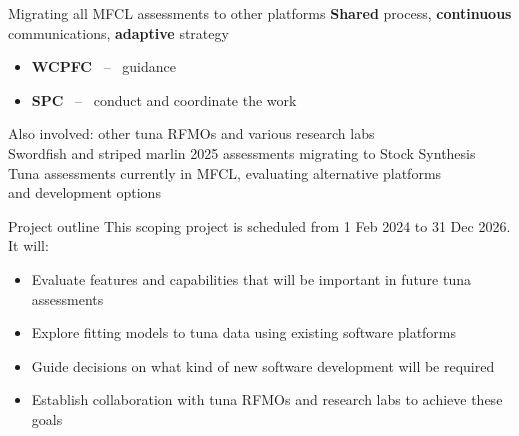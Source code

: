\documentclass[aspectratio=169,fleqn]{beamer}
\begin{document}

\begin{frame}{Migrating all MFCL assessments to other platforms}
  \textbf{\darkgreen Shared} process, {\darkgreen\bf continuous} communications,
  {\darkgreen\bf adaptive} strategy\\[2ex]
  \begin{itemize}
    \item[] {\blue\bf WCPFC} ~--~ guidance\\[2ex]
    \item[] {\blue\bf SPC} ~--~ conduct and coordinate the work\\[3ex]
  \end{itemize}
  Also involved: other tuna RFMOs and various research labs\\[4ex]
  Swordfish and striped marlin 2025 assessments migrating to Stock
  Synthesis\\[4ex]
  Tuna assessments currently in MFCL, evaluating alternative platforms\\
  and development options\\[1ex]
\end{frame}


\begin{frame}{Project outline}
  This scoping project is scheduled from 1 Feb 2024 to 31 Dec 2026. It
  will:\\[3ex]
  \begin{itemize}
    \item[] Evaluate features and capabilities that will be important in future
    tuna assessments\\[3ex]
    \item[] Explore fitting models to tuna data using existing software
    platforms\\[3ex]
    \item[] Guide decisions on what kind of new software development will be
    required\\[3ex]
    \item[] Establish collaboration with tuna RFMOs and research labs to achieve
    these goals\\[3ex]
  \end{itemize}
\end{frame}

\end{document}

